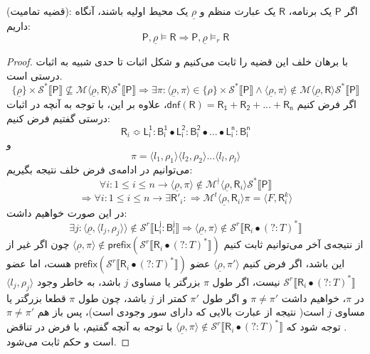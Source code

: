 \begin{thm}

	(قضیه تمامیت): اگر $\mathsf{P}$ یک برنامه، $\mathsf{R}$ یک عبارت منظم و $\underline{\rho}$ یک محیط اولیه باشند، آنگاه داریم:
$$\mathsf{P},\underline{\rho} \models \mathsf{R} \Rightarrow
\mathsf{P},\underline{\rho} \models_r \mathsf{R}$$
\end{thm}
\begin{proof}
	با برهان خلف این قضیه را ثابت می‌کنیم و شکل اثبات تا حدی شبیه به اثبات درستی است.
	$$\{\underline{\rho}\}\times \mathcal{S}^* \llbracket \mathsf{P} \rrbracket \nsubseteq \mathcal{M}\langle \underline{\rho}, \mathsf{R} \rangle \mathcal{S}^* \llbracket \mathsf{P} \rrbracket \Rightarrow
	\exists \pi:\langle \underline{\rho}, \pi \rangle \in \{\rho\}\times \mathcal{S}^* \llbracket \mathsf{P}\rrbracket \land \langle \underline{\rho}, \pi \rangle \notin \mathcal{M}\langle \underline{\rho},\mathsf{R}\rangle\mathcal{S}^* \llbracket \mathsf{P} \rrbracket$$
	اگر فرض کنیم
	$\mathsf{dnf(R)=R_1+R_2+...+R_n}$،
	علاوه بر این، با توجه به آنچه در اثبات درستی گفتیم فرض کنیم:
	$$\mathsf{R}_i \Bumpeq \mathsf{L_i^1:B_i^1 \bullet L_i^2:B_i^2 \bullet ... \bullet L_i^n:B_i^n}$$ 
	و
	$$\pi=\langle l_1 ,\rho_1 \rangle \langle l_2 ,\rho_2 \rangle ... \langle l_l ,\rho_l \rangle$$
	می‌توانیم در ادامه‌ی فرض خلف نتیجه بگیریم:
	$$\forall i:1 \leq i \leq n \rightarrow 
	\langle \underline{\rho}, \pi \rangle \notin \mathcal{M}^\nmid \langle \underline{\rho}, \mathsf{R}_i \rangle \mathcal{S}^* \llbracket \mathsf{P} \rrbracket$$
	$$\Rightarrow\forall i:1 \leq i \leq n \rightarrow\exists \mathsf{R'}_i:\Rightarrow \mathcal{M}^t \langle \underline{\rho},\mathsf{R}_i \rangle \pi = \langle \mathit{F},\mathsf{R}_i^k \rangle$$
	در این صورت خواهیم داشت:
	$$\exists j: \langle \underline{\rho},\langle l_j,\rho_j \rangle \rangle \notin \mathcal{S}^r \llbracket \mathsf{L_i^j:B_i^j} \rrbracket
	\Rightarrow \langle \underline{\rho},\pi \rangle \notin \mathcal {S}^r \llbracket \mathsf{R}_i \bullet (?:\mathit{T})^* \rrbracket$$
	از نتیجه‌ی آخر می‌توانیم ثابت کنیم 
	$\langle \underline{\rho},\pi \rangle \notin \mathsf{prefix}(\mathcal {S}^r \llbracket \mathsf{R}_i \bullet (?:\mathit{T})^* \rrbracket)$
	چون اگر غیر از این باشد، اگر فرض کنیم 
	$\langle \underline{\rho}, \pi' \rangle$
	 عضو 
	 $\mathsf{prefix}(\mathcal {S}^r \llbracket \mathsf{R}_i \bullet (?:\mathit{T})^* \rrbracket)$
	 هست، اما عضو \break
	 $\mathcal {S}^r \llbracket \mathsf{R}_i \bullet (?:\mathit{T})^* \rrbracket$
	 نیست، اگر طول $\pi$ بزرگتر یا مساوی $j$ باشد، به خاطر وجود 
	 $\langle l_j,\rho_j \rangle$
	 در $\pi$، خواهیم داشت $\pi \neq \pi'$ و اگر طول $\pi'$ کمتر از $j$ باشد، چون طول $\pi$ قطعا بزرگتر یا مساوی $j$ است( نتیجه از عبارت بالایی که دارای سور وجودی است)، پس باز هم 
	 $\pi \neq \pi'$.
	 توجه شود که 
	 $\langle \underline{\rho},\pi \rangle \notin \mathcal {S}^r \llbracket \mathsf{R}_i \bullet (?:\mathit{T})^* \rrbracket$
	 با توجه به آنچه گفتیم، با فرض در تناقض است و حکم ثابت می‌شود.
\end{proof}
